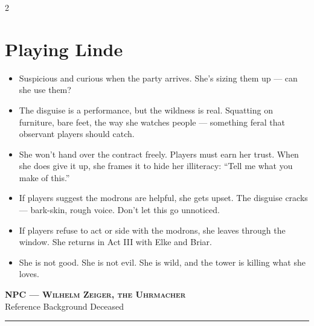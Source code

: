 \documentclass[10pt,letterpaper]{article}
\newcommand{\sceneheader}[4]{%
  \fancyhead[L]{\small\textcolor{accent}{\scshape #1}}%
  \fancyhead[R]{\small\textcolor{accent}{#2 \quad \textbullet \quad #3}}%
  \begin{center}
  {\LARGE\bfseries\scshape\textcolor{accent}{#1}}\\[2pt]
  {\small #2 \quad \textbullet \quad #3 \quad \textbullet \quad #4}\\[2pt]
  \textcolor{rulecol}{\rule{0.5\textwidth}{0.8pt}}
  \end{center}
  \vspace{-4pt}
}
\begin{document}
\begin{multicols}{2}
\section*{Playing Linde}
\begin{itemize}
\item Suspicious and curious when the party arrives. She's sizing them up --- can she use them?
\item The disguise is a performance, but the wildness is real. Squatting on furniture, bare feet, the way she watches people --- something feral that observant players should catch.
\item She won't hand over the contract freely. Players must earn her trust. When she does give it up, she frames it to hide her illiteracy: ``Tell me what you make of this.''
\item If players suggest the modrons are helpful, she gets upset. The disguise cracks --- bark-skin, rough voice. Don't let this go unnoticed.
\item If players refuse to act or side with the modrons, she leaves through the window. She returns in Act III with Elke and Briar.
\item She is not good. She is not evil. She is wild, and the tower is killing what she loves.
\end{itemize}

\end{multicols}

\newpage


\label{sec:npc-zeiger}\sceneheader{NPC --- Wilhelm Zeiger, the Uhrmacher}{Reference}{Background}{Deceased}
\end{document}
